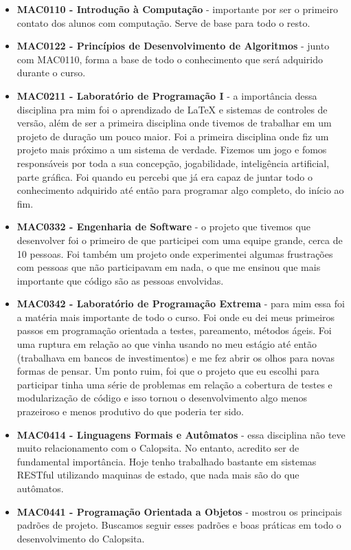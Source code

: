 \documentclass[titlepage,a4paper]{article}
\newcommand{\calopsita}{Calopsita}
\begin{document}
\begin{itemize}
	\item{\textbf{MAC0110 - Introdução à Computação} - importante por ser o primeiro contato dos alunos com computação. Serve de base para todo o resto.}
	\item{\textbf{MAC0122 - Princípios de Desenvolvimento de Algoritmos} - junto com MAC0110, forma a base de todo o conhecimento que será adquirido durante o curso.}
	\item{\textbf{MAC0211 - Laboratório de Programação I} - a importância dessa disciplina pra mim foi o aprendizado de \LaTeX{} e sistemas de controles de versão, além de ser a primeira disciplina onde tivemos de trabalhar em um projeto de duração um pouco maior. Foi a primeira disciplina onde fiz um projeto mais próximo a um sistema de verdade. Fizemos um jogo e fomos responsáveis por toda a sua concepção, jogabilidade, inteligência artificial, parte gráfica. Foi quando eu percebi que já era capaz de juntar todo o conhecimento adquirido até então para programar algo completo, do início ao fim.}
	\item{\textbf{MAC0332 - Engenharia de Software} - o projeto que tivemos que desenvolver  foi o primeiro de que participei com uma equipe grande, cerca de 10 pessoas. Foi também um projeto onde experimentei algumas frustrações com pessoas que não participavam em nada, o que me ensinou que mais importante que código são as pessoas envolvidas.}
	\item{\textbf{MAC0342 - Laboratório de Programação Extrema} - para mim essa foi a matéria mais importante de todo o curso. Foi onde eu dei meus primeiros passos em programação orientada a testes, pareamento, métodos ágeis. Foi uma ruptura em relação ao que vinha usando no meu estágio até então (trabalhava em bancos de investimentos) e me fez abrir os olhos para novas formas de pensar. Um ponto ruim, foi que o projeto que eu escolhi para participar tinha uma série de problemas em relação a cobertura de testes e modularização de código e isso tornou o desenvolvimento algo menos prazeiroso e menos produtivo do que poderia ter sido.}
	\item{\textbf{MAC0414 - Linguagens Formais e Autômatos} - essa disciplina não teve muito relacionamento com o \calopsita{}. No entanto, acredito ser de fundamental importância. Hoje tenho trabalhado bastante em sistemas RESTful utilizando maquinas de estado, que nada mais são do que autômatos.}
	\item{\textbf{MAC0441 - Programação Orientada a Objetos} - mostrou os principais padrões de projeto. Buscamos seguir esses padrões e boas práticas em todo o desenvolvimento do \calopsita{}.}
\end{itemize}
\end{document}
